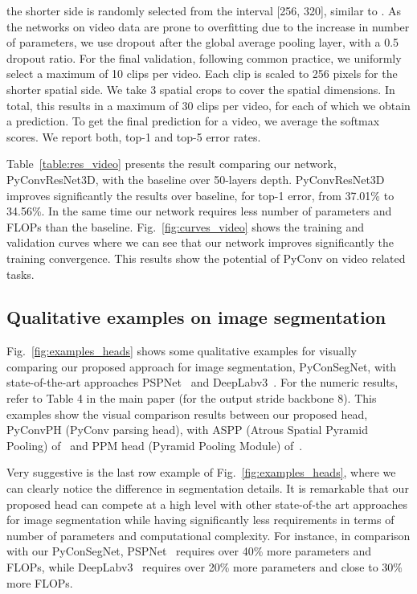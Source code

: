 \documentclass{article}
\begin{document}
 the shorter side is randomly selected from the interval [256, 320], similar to \cite{simonyan2014very,wang2018non}.  As the networks on video data are prone to overfitting due to the increase in number of parameters, we use dropout \cite{hinton2012improving} after the global average pooling layer, with a 0.5 dropout ratio. For the final validation, following common practice, we uniformly select a maximum of 10 clips per video. Each clip is scaled  to 256 pixels for the shorter spatial side. We take 3 spatial crops to cover the spatial dimensions. In total, this results in a  maximum  of 30 clips per video, for each of which we obtain a prediction. To get the final prediction for a video, we average the softmax scores. We report both, top-1 and top-5 error rates. 



Table~\ref{table:res_video} presents the result comparing our network,  PyConvResNet3D, with the baseline over 50-layers depth. PyConvResNet3D improves significantly the results over baseline, for top-1 error, from 37.01\% to 34.56\%. In the same time our network requires less number of parameters and FLOPs than the baseline.  Fig.~\ref{fig:curves_video} shows the training and validation curves where we can see that our network improves significantly the training convergence. This results show the potential of PyConv on video related tasks. 



\subsection{Qualitative examples on image segmentation \label{sec:vis_ex}}
Fig.~\ref{fig:examples_heads} shows  some qualitative examples for visually comparing our proposed approach for image segmentation, PyConSegNet, with state-of-the-art approaches  PSPNet~\cite{zhao2017pyramid} and DeepLabv3~\cite{chen2017rethinking}. For the numeric results, refer to Table 4 in the main paper (for the output stride backbone 8). 
This examples show the visual comparison results between our proposed head, PyConvPH (PyConv parsing head), with ASPP  (Atrous Spatial Pyramid Pooling) of~\cite{chen2017rethinking} and PPM head (Pyramid Pooling Module) of~\cite{zhao2017pyramid}.

Very suggestive is the last row example of Fig.~\ref{fig:examples_heads}, where we can clearly notice the difference in segmentation details.
It is remarkable that our proposed head can compete at a high level with other state-of-the art approaches for image segmentation while having significantly less requirements in terms of number of parameters and computational complexity. For instance, in comparison with our PyConSegNet, PSPNet~\cite{zhao2017pyramid} requires  over  40\%   more parameters and FLOPs, while DeepLabv3~\cite{chen2017rethinking} requires over 20\%  more parameters and close  to 30\% more FLOPs.
\end{document}
